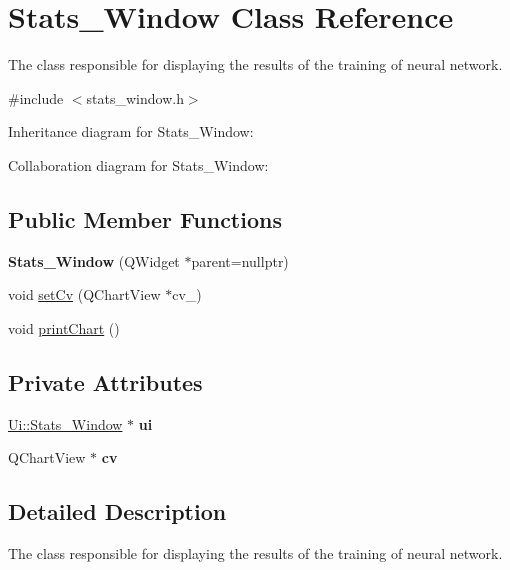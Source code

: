 \hypertarget{class_stats___window}{}\section{Stats\+\_\+\+Window Class Reference}
\label{class_stats___window}


The class responsible for displaying the results of the training of neural network.  




{\ttfamily \#include $<$stats\+\_\+window.\+h$>$}



Inheritance diagram for Stats\+\_\+\+Window\+:


Collaboration diagram for Stats\+\_\+\+Window\+:
\subsection*{Public Member Functions}
\begin{DoxyCompactItemize}
\item 
\mbox{\label{class_stats___window_a49651757f1c1248f77379112365e8e25}} 
{\bfseries Stats\+\_\+\+Window} (Q\+Widget $\ast$parent=nullptr)
\item 
void \hyperlink{class_stats___window_aa08614ebaf747b305a39bb790d2a96bd}{set\+Cv} (Q\+Chart\+View $\ast$cv\+\_\+)
\item 
void \hyperlink{class_stats___window_a1bdd2d19e64d9c316754e3f667ebbecb}{print\+Chart} ()
\end{DoxyCompactItemize}
\subsection*{Private Attributes}
\begin{DoxyCompactItemize}
\item 
\mbox{\label{class_stats___window_accb4cf095537cc89ba483a6122eda2c3}} 
\hyperlink{class_ui_1_1_stats___window}{Ui\+::\+Stats\+\_\+\+Window} $\ast$ {\bfseries ui}
\item 
\mbox{\label{class_stats___window_a0ca677bc8512151b105d24de3b9ea1ce}} 
Q\+Chart\+View $\ast$ {\bfseries cv}
\end{DoxyCompactItemize}


\subsection{Detailed Description}
The class responsible for displaying the results of the training of neural network. 



